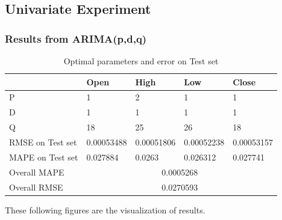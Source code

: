 \documentclass[11pt]{article}
\begin{document}
\subsection{Univariate Experiment}
\subsubsection{Results from ARIMA(p,d,q)}

\begin{table}[H]
  \centering
\begin{tabular}{|l|l|l|l|l|}
  \hline
  & Open        & High       & Low        & Close      \\ \hline
  P                & 1           & 2          & 1          & 1          \\ \hline
  D                & 1           & 1          & 1          & 1          \\ \hline
  Q                & 18          & 25         & 26         & 18         \\ \hline
  RMSE on Test set & 0.00053488  & 0.00051806 & 0.00052238 & 0.00053157 \\ \hline
  MAPE on Test set & 0.027884    & 0.0263     & 0.026312   & 0.027741   \\ \hline
  Overall MAPE     & \multicolumn{4}{c|}{0.0005268}                     \\ \hline
  Overall RMSE     & \multicolumn{4}{c|}{0.0270593}                     \\ \hline
\end{tabular}
\caption{Optimal parameters and error on Test set}
\end{table}
These following figures are the visualization of results.
\end{document}
